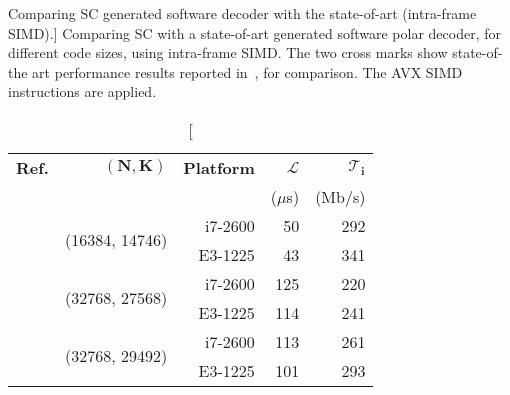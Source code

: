\begin{table}[htp]
  \centering
  \caption
    [Comparing SC generated software decoder with the state-of-art (intra-frame
    SIMD).]
    {Comparing SC with a state-of-art generated software polar decoder, for
     different code sizes, using intra-frame SIMD. The two cross marks show
     state-of-the art performance results reported in~\cite{Sarkis2014}, for
     comparison. The AVX SIMD instructions are applied.}
  \label{tab:eval_polar_sc_gen_thr_comparison}
  \begin{tabular}{r  r r  r  r}
    \textbf{Ref.}        & $\bm{(N, K)}$                   & \textbf{Platform} & $\bm{\mathcal{L}}$ & $\bm{\mathcal{T}_i}$ \\
                         &                                 &                   &           ($\mu$s) &               (Mb/s) \\
    \hline
    \hline
    \cite{Sarkis2014}    & \multirow{2}{*}{(16384, 14746)} &           i7-2600 &                 50 &                  292 \\
    \cite{Cassagne2015c} &                                 &           E3-1225 &                 43 &                  341 \\
    \hline
    \cite{Sarkis2014}    & \multirow{2}{*}{(32768, 27568)} &           i7-2600 &                125 &                  220 \\
    \cite{Cassagne2015c} &                                 &           E3-1225 &                114 &                  241 \\
    \hline
    \cite{Sarkis2014}    & \multirow{2}{*}{(32768, 29492)} &           i7-2600 &                113 &                  261 \\
    \cite{Cassagne2015c} &                                 &           E3-1225 &                101 &                  293 \\
  \end{tabular}
\end{table}

